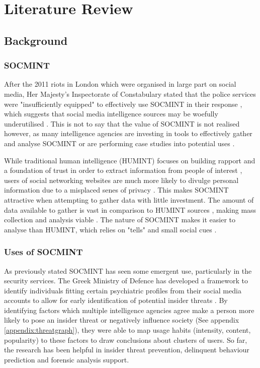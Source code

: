 \documentclass[12pt]{article}
\begin{document}
\newpage
\section{Literature Review}
\subsection{Background}
\subsubsection{SOCMINT}
After the 2011 riots in London which were organised in large part on social media, Her Majesty's Inspectorate of Constabulary stated that the police services were "insufficiently equipped" to effectively use SOCMINT in their response \citep{socmintpublicsafety}, which suggests that social media intelligence sources may be woefully underutilised \citep{socmintoverview}. This is not to say that the value of SOCMINT is not realised however, as many intelligence agencies are investing in tools to effectively gather and analyse SOCMINT \citep{socmintpublicsafety} or are performing case studies into potential uses \citep{bostonbombingcasestudy}.

While traditional human intelligence (HUMINT) focuses on building rapport and a foundation of trust in order to extract information from people of interest \citep{humintinterrogators}, users of social networking websites are much more likely to divulge personal information due to a misplaced senes of privacy \citep{socialmediacontent}. This makes SOCMINT attractive when attempting to gather data with little investment. The amount of data available to gather is vast in comparison to HUMINT sources \citep{socmintoverview}, making mass collection and analysis viable \citep{prismslides}. The nature of SOCMINT makes it easier to analyse than HUMINT, which relies on "tells" and small social cues \citep{humintinterrogators}.

\subsubsection{Uses of SOCMINT}
As previously stated SOCMINT has seen some emergent use, particularly in the security services. The Greek Ministry of Defence has developed a framework to identify individuals fitting certain psychiatric profiles from their social media accounts to allow for early identification of potential insider threats \citep{behaviourdetection}. By identifying factors which multiple intelligence agencies agree make a person more likely to pose an insider threat or negatively influence society (See appendix \ref{appendix:threatgraph}), they were able to map usage habits (intensity, content, popularity) to these factors to draw conclusions about clusters of users. So far, the research has been helpful in insider threat prevention, delinquent behaviour prediction and forensic analysis support.
\end{document}
